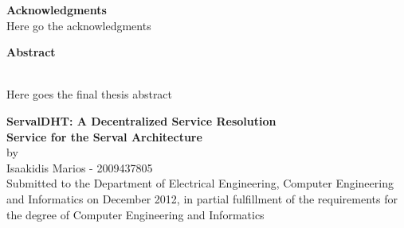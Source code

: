 \documentclass[12pt,a4paper,oneside]{article}
\begin{document}



\pagestyle{plain}
\setcounter{page}{1}


\newpage
{\Large \bf \noindent Acknowledgments}
\\Here go the acknowledgments


\newpage
\tableofcontents


\newpage
\renewcommand{\nomname}{Abbreviations}
\printnomenclature


\newpage
{\Large \bf \noindent Abstract}
\\Here goes the final thesis abstract


\newpage
\begin{center}
{\large {\bf  ServalDHT: A Decentralized Service Resolution\\ Service for the Serval Architecture}\\[0.5cm] by \\[0.5cm] Isaakidis Marios - 2009437805}
 ~\\[0.5cm]
Submitted to the Department of Electrical Engineering, Computer Engineering and Informatics on December 2012, in partial fulfillment of the requirements for the degree of Computer Engineering and Informatics
\end{center}

\vfill
\end{document}
